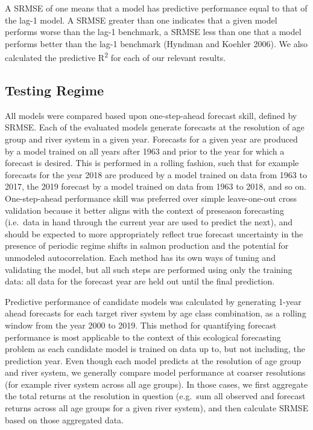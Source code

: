 \documentclass[
]{article}
\begin{document}
A SRMSE of one means that a model has predictive performance equal to that of the lag-1 model. A SRMSE greater than one indicates that a given model performs worse than the lag-1 benchmark, a SRMSE less than one that a model performs better than the lag-1 benchmark (Hyndman and Koehler 2006). We also calculated the predictive R\textsuperscript{2} for each of our relevant results.

\hypertarget{testing-regime}{%
\subsection*{Testing Regime}\label{testing-regime}}

All models were compared based upon one-step-ahead forecast skill, defined by SRMSE. Each of the evaluated models generate forecasts at the resolution of age group and river system in a given year. Forecasts for a given year are produced by a model trained on all years after 1963 and prior to the year for which a forecast is desired. This is performed in a rolling fashion, such that for example forecasts for the year 2018 are produced by a model trained on data from 1963 to 2017, the 2019 forecast by a model trained on data from 1963 to 2018, and so on. One-step-ahead performance skill was preferred over simple leave-one-out cross validation because it better aligns with the context of preseason forecasting (i.e.~data in hand through the current year are used to predict the next), and should be expected to more appropriately reflect true forecast uncertainty in the presence of periodic regime shifts in salmon production and the potential for unmodeled autocorrelation. Each method has its own ways of tuning and validating the model, but all such steps are performed using only the training data: all data for the forecast year are held out until the final prediction.

Predictive performance of candidate models was calculated by generating 1-year ahead forecasts for each target river system by age class combination, as a rolling window from the year 2000 to 2019. This method for quantifying forecast performance is most applicable to the context of this ecological forecasting problem as each candidate model is trained on data up to, but not including, the prediction year. Even though each model predicts at the resolution of age group and river system, we generally compare model performance at coarser resolutions (for example river system across all age groups). In those cases, we first aggregate the total returns at the resolution in question (e.g.~sum all observed and forecast returns across all age groups for a given river system), and then calculate SRMSE based on those aggregated data.
\end{document}
